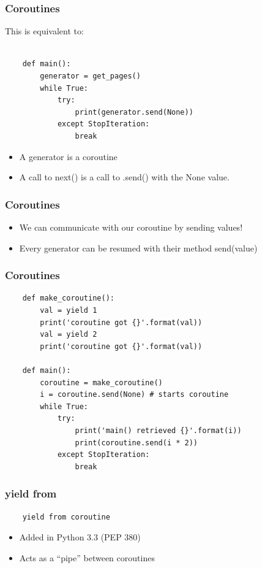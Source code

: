 \documentclass[ignorenonframetext,]{beamer}
\begin{document}
\begin{frame}[fragile]\frametitle{Coroutines}

This is equivalent to:

\begin{verbatim}

    def main():
        generator = get_pages()
        while True:
            try:
                print(generator.send(None))
            except StopIteration:
                break

\end{verbatim}

\begin{itemize}[<+->]
\itemsep1pt\parskip0pt
\item
  A generator is a coroutine
\item
  A call to next() is a call to .send() with the None value.
\end{itemize}

\end{frame}

\begin{frame}[fragile]\frametitle{Coroutines}

\begin{itemize}[<+->]
\itemsep1pt\parskip0pt
\item
  We can communicate with our coroutine by sending values!
\item
  Every generator can be resumed with their method send(value)
\end{itemize}

\end{frame}

\begin{frame}[fragile]\frametitle{Coroutines}

\footnotesize{
\begin{verbatim}
    def make_coroutine():
        val = yield 1
        print('coroutine got {}'.format(val))
        val = yield 2
        print('coroutine got {}'.format(val))

    def main():
        coroutine = make_coroutine()
        i = coroutine.send(None) # starts coroutine
        while True:
            try:
                print('main() retrieved {}'.format(i))
                print(coroutine.send(i * 2))
            except StopIteration:
                break
\end{verbatim}
}

\end{frame}

\begin{frame}[fragile]\frametitle{yield from}

\begin{verbatim}
    yield from coroutine
\end{verbatim}

\begin{itemize}[<+->]
\itemsep1pt\parskip0pt
\item
  Added in Python 3.3 (PEP 380)
\item
  Acts as a ``pipe'' between coroutines
\end{itemize}

\end{frame}
\end{document}
